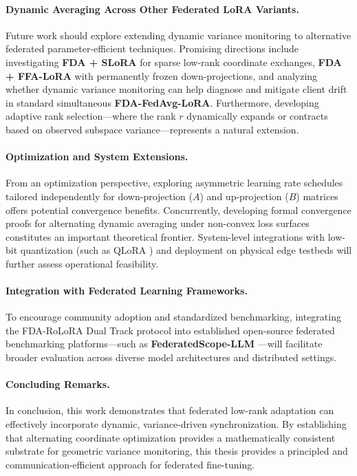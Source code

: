 \paragraph{Dynamic Averaging Across Other Federated LoRA Variants.}
Future work should explore extending dynamic variance monitoring to alternative federated parameter-efficient techniques. Promising directions include investigating \textbf{FDA + SLoRA} \cite{babakniya2023slora} for sparse low-rank coordinate exchanges, \textbf{FDA + FFA-LoRA} \cite{sun2024improving} with permanently frozen down-projections, and analyzing whether dynamic variance monitoring can help diagnose and mitigate client drift in standard simultaneous \textbf{FDA-FedAvg-LoRA}. Furthermore, developing adaptive rank selection—where the rank $r$ dynamically expands or contracts based on observed subspace variance—represents a natural extension.

\paragraph{Optimization and System Extensions.}
From an optimization perspective, exploring asymmetric learning rate schedules tailored independently for down-projection ($A$) and up-projection ($B$) matrices offers potential convergence benefits. Concurrently, developing formal convergence proofs for alternating dynamic averaging under non-convex loss surfaces constitutes an important theoretical frontier. System-level integrations with low-bit quantization (such as QLoRA \cite{dettmers2023qlora}) and deployment on physical edge testbeds will further assess operational feasibility.

\paragraph{Integration with Federated Learning Frameworks.}
To encourage community adoption and standardized benchmarking, integrating the FDA-RoLoRA Dual Track protocol into established open-source federated benchmarking platforms—such as \textbf{FederatedScope-LLM} \cite{kuang2023federatedscope}—will facilitate broader evaluation across diverse model architectures and distributed settings.

\paragraph{Concluding Remarks.}
In conclusion, this work demonstrates that federated low-rank adaptation can effectively incorporate dynamic, variance-driven synchronization. By establishing that alternating coordinate optimization provides a mathematically consistent substrate for geometric variance monitoring, this thesis provides a principled and communication-efficient approach for federated fine-tuning.

